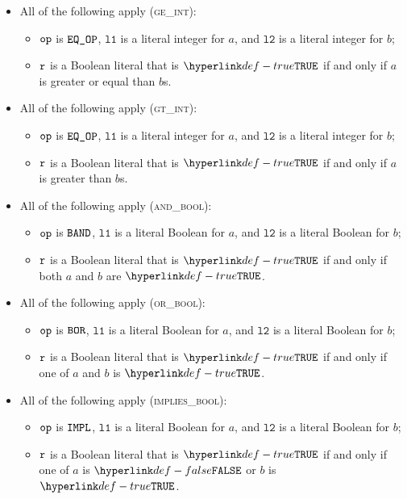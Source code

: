 \documentclass{book}
\newcommand\vlone[0]{\texttt{l1}}
\newcommand\vltwo[0]{\texttt{l2}}
\begin{document}
\begin{itemize}
  \item All of the following apply (\textsc{ge\_int}):
  \begin{itemize}
    \item $\texttt{op}$ is $\texttt{EQ\_OP}$, $\vlone$ is a literal integer for $a$, and $\vltwo$ is a literal integer for $b$;
    \item $\texttt{r}$ is a Boolean literal that is $\True$ if and only if $a$ is greater or equal than $b$s.
  \end{itemize}

  \item All of the following apply (\textsc{gt\_int}):
  \begin{itemize}
    \item $\texttt{op}$ is $\texttt{EQ\_OP}$, $\vlone$ is a literal integer for $a$, and $\vltwo$ is a literal integer for $b$;
    \item $\texttt{r}$ is a Boolean literal that is $\True$ if and only if $a$ is greater than $b$s.
  \end{itemize}

  \item All of the following apply (\textsc{and\_bool}):
  \begin{itemize}
    \item $\texttt{op}$ is $\texttt{BAND}$, $\vlone$ is a literal Boolean for $a$, and $\vltwo$ is a literal Boolean for $b$;
    \item $\texttt{r}$ is a Boolean literal that is $\True$ if and only if both $a$ and $b$ are $\True$.
  \end{itemize}

  \item All of the following apply (\textsc{or\_bool}):
  \begin{itemize}
    \item $\texttt{op}$ is $\texttt{BOR}$, $\vlone$ is a literal Boolean for $a$, and $\vltwo$ is a literal Boolean for $b$;
    \item $\texttt{r}$ is a Boolean literal that is $\True$ if and only if one of $a$ and $b$ is $\True$.
  \end{itemize}

  \item All of the following apply (\textsc{implies\_bool}):
  \begin{itemize}
    \item $\texttt{op}$ is $\texttt{IMPL}$, $\vlone$ is a literal Boolean for $a$, and $\vltwo$ is a literal Boolean for $b$;
    \item $\texttt{r}$ is a Boolean literal that is $\True$ if and only if one of $a$ is $\False$ or $b$ is $\True$.
  \end{itemize}


\end{itemize}
\end{document}
